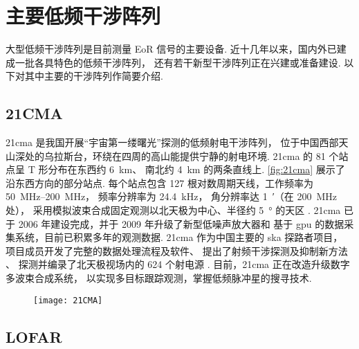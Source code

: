 \section{主要低频干涉阵列}
\label{sec:instruments}

大型低频干涉阵列是目前测量 EoR 信号的主要设备.
近十几年以来，国内外已建成一批各具特色的低频干涉阵列，
还有若干新型干涉阵列正在兴建或准备建设.
以下对其中主要的干涉阵列作简要介绍.

\subsection{21CMA}

\acf{21cma} 是我国开展“宇宙第一缕曙光”探测的低频射电干涉阵列，
位于中国西部天山深处的乌拉斯台，环绕在四周的高山能提供宁静的射电环境.
\acs{21cma} 的 81 个站点呈 T 形分布在东西约 \SI{6}{\km}、
南北约 \SI{4}{\km} 的两条直线上.
\autoref{fig:21cma} 展示了沿东西方向的部分站点.
每个站点包含 127 根对数周期天线，工作频率为 \SIrange{50}{200}{\MHz}，
频率分辨率为 \SI{24.4}{\kHz}，
角分辨率达 \SI{1}{\arcminute}（在 \SI{200}{\MHz} 处），
采用模拟波束合成固定观测以北天极为中心、半径约 \SI{5}{\degree} 的天区
\cite{wang2013,zheng2016}.
\acs{21cma} 已于 2006 年建设完成，并于 2009 年升级了新型低噪声放大器和
基于 \acs{gpu} 的数据采集系统，目前已积累多年的观测数据.
\acs{21cma} 作为中国主要的 \acs{ska} 探路者项目，
项目成员开发了完整的数据处理流程及软件、
提出了射频干涉探测及抑制新方法 \cite{huang2016}、
探测并编录了北天极视场内的 624 个射电源 \cite{zheng2016}.
目前，\acs{21cma} 正在改造升级数字多波束合成系统，
以实现多目标跟踪观测，掌握低频脉冲星的搜寻技术.

\begin{figure}
  \centering
  \texttt{[image: 21CMA]}
  \label{fig:21cma}
\end{figure}

\subsection{LOFAR}

